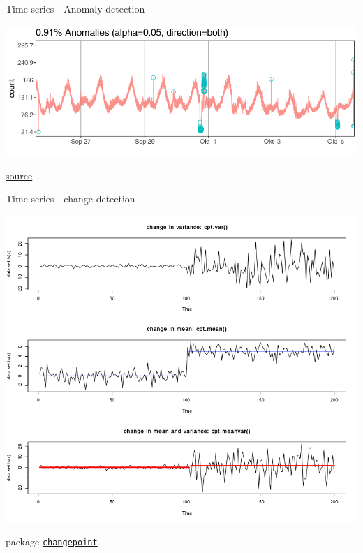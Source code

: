 \documentclass[8pt,ignorenonframetext,]{beamer}
\begin{document}
\begin{frame}{Time series - Anomaly detection}

\includegraphics{imgPres/TS_anomalydetection.png}

\href{https://github.com/twitter/AnomalyDetection}{source}

\end{frame}

\begin{frame}[fragile]{Time series - change detection}

\includegraphics{imgPres/TS_changedetection.png}

package
\href{https://cran.r-project.org/web/packages/changepoint}{\texttt{changepoint}}

\end{frame}
\end{document}
